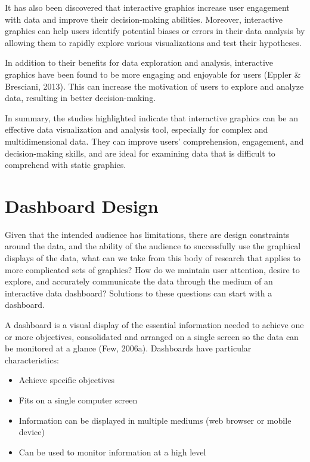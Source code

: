 \documentclass[print]{nuthesis}
\begin{document}
It has also been discovered that interactive graphics increase user engagement with data and improve their decision-making abilities.
Moreover, interactive graphics can help users identify potential biases or errors in their data analysis by allowing them to rapidly explore various visualizations and test their hypotheses.

In addition to their benefits for data exploration and analysis, interactive graphics have been found to be more engaging and enjoyable for users (Eppler \& Bresciani, 2013).
This can increase the motivation of users to explore and analyze data, resulting in better decision-making.

In summary, the studies highlighted indicate that interactive graphics can be an effective data visualization and analysis tool, especially for complex and multidimensional data.
They can improve users' comprehension, engagement, and decision-making skills, and are ideal for examining data that is difficult to comprehend with static graphics.

\hypertarget{dashboard-design}{%
\section{Dashboard Design}\label{dashboard-design}}

Given that the intended audience has limitations, there are design constraints around the data, and the ability of the audience to successfully use the graphical displays of the data, what can we take from this body of research that applies to more complicated sets of graphics?
How do we maintain user attention, desire to explore, and accurately communicate the data through the medium of an interactive data dashboard?
Solutions to these questions can start with a dashboard.

A dashboard is a visual display of the essential information needed to achieve one or more objectives, consolidated and arranged on a single screen so the data can be monitored at a glance (Few, 2006a).
Dashboards have particular characteristics:

\begin{itemize}
\item
  Achieve specific objectives
\item
  Fits on a single computer screen
\item
  Information can be displayed in multiple mediums (web browser or mobile device)
\item
  Can be used to monitor information at a high level
\end{itemize}
\end{document}
